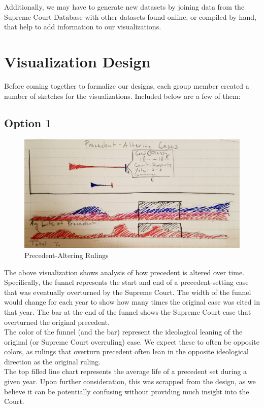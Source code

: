 \documentclass{article}
\begin{document}
Additionally, we may have to generate new datasets by joining data from the Supreme Court Database with other datasets found online, or compiled by hand, that help to add information to our visualizations.

\section{Visualization Design}
Before coming together to formalize our designs, each group member created a number of sketches for the visualizations.  Included below are a few of them:
\subsection{Option 1}
\begin{figure}[h!]
    \includegraphics[width=\linewidth]{pics/precedentalteration.jpg}
    \caption{Precedent-Altering Rulings}
    \label{fig:roughprecedent}
\end{figure}
\FloatBarrier
The above visualization shows analysis of how precedent is altered over time.  Specifically, the funnel represents the start and end of a precedent-setting case that was eventually overturned by the Supreme Court.  The width of the funnel would change for each year to show how many times the original case was cited in that year.  The bar at the end of the funnel shows the Supreme Court case that overturned the original precedent.\\

The color of the funnel (and the bar) represent the ideological leaning of the original (or Supreme Court overruling) case.  We expect these to often be opposite colors, as rulings that overturn precedent often lean in the opposite ideological direction as the original ruling.\\

The top filled line chart represents the average life of a precedent set during a given year.  Upon further consideration, this was scrapped from the design, as we believe it can be potentially confusing without providing much insight into the Court.\\
\end{document}
